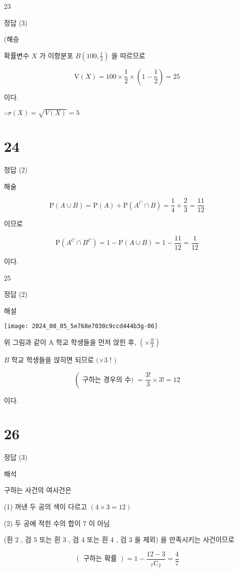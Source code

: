 \documentclass[10pt]{article}
\begin{document}
23

정답 (3)

(해승

확률변수 \(X\) 가 이항분포 \(B\left(100, \frac{1}{2}\right)\) 을 따르므로

\[
\mathrm{V}(X)=100 \times \frac{1}{2} \times\left(1-\frac{1}{2}\right)=25
\]

이다.

\(\therefore \sigma(X)=\sqrt{V(X)}=5\)

\section*{24}
정답 (2)

해술

\[
\mathrm{P}(A \cup B)=\mathrm{P}(A)+\mathrm{P}\left(A^{C} \cap B\right)=\frac{1}{4}+\frac{2}{3}=\frac{11}{12}
\]

이므로

\[
\mathrm{P}\left(A^{C} \cap B^{C}\right)=1-\mathrm{P}(A \cup B)=1-\frac{11}{12}=\frac{1}{12}
\]

이다.

25

정답 (2)

해설

\begin{center}
\texttt{[image: 2024\_08\_05\_5e768e7030c9ccd444b3g-06]}
\end{center}

위 그림과 같이 A 학교 학생들을 먼저 앉힌 후, \(\left(\times \frac{3!}{3}\right)\)

\(B\) 학교 학생들을 앉히면 되므로 \((\times 3\) ! \()\)

\[
\left(\text { 구하는 경우의 수) }=\frac{3!}{3} \times 3!=12\right.
\]

이다.

\section*{26}
정답 (3)

해석

구하는 사건의 여사건은

(1) 꺼낸 두 공의 색이 다르고 \((4 \times 3=12)\)

(2) 두 공에 적힌 수의 합이 7 이 아님

(흰 2 , 검 5 또는 흰 3 , 검 4 또는 흰 4 , 검 3 을 제외) 을 만족시키는 사건이므로

\[
(\text { 구하는 확률 })=1-\frac{12-3}{{ }_{7} \mathrm{C}_{2}}=\frac{4}{7}
\]
\end{document}
